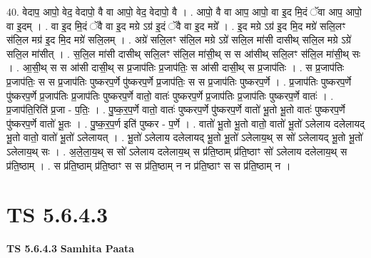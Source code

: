 \documentclass[17pt]{extarticle}
\begin{document}
40. वेदाप॒ आपो॒ वेद॒ वेदापो॒ वै वा आपो॒ वेद॒ वेदापो॒ वै । . आपो॒ वै वा आप॒ आपो॒ वा इ॒द मि॒दं ॅवा आप॒ आपो॒ वा इ॒दम् । . वा इ॒द मि॒दं ॅवै वा इ॒द मग्रे ऽग्र॑ इ॒दं ॅवै वा इ॒द मग्रे᳚ । . इ॒द मग्रे ऽग्र॑ इ॒द मि॒द मग्रे॑ सलि॒लꣳ स॑लि॒ल मग्र॑ इ॒द मि॒द मग्रे॑ सलि॒लम् । . अग्रे॑ सलि॒लꣳ स॑लि॒ल मग्रे ऽग्रे॑ सलि॒ल मा॑सी दासीथ् सलि॒ल मग्रे ऽग्रे॑ सलि॒ल मा॑सीत् । . स॒लि॒ल मा॑सी दासीथ् सलि॒लꣳ स॑लि॒ल मा॑सी॒थ् स स आ॑सीथ् सलि॒लꣳ स॑लि॒ल मा॑सी॒थ् सः । . आ॒सी॒थ् स स आ॑सी दासी॒थ् स प्र॒जाप॑तिः प्र॒जाप॑तिः॒ स आ॑सी दासी॒थ् स प्र॒जाप॑तिः । . स प्र॒जाप॑तिः प्र॒जाप॑तिः॒ स स प्र॒जाप॑तिः पुष्करप॒र्णे पु॑ष्करप॒र्णे प्र॒जाप॑तिः॒ स स प्र॒जाप॑तिः पुष्करप॒र्णे । . प्र॒जाप॑तिः पुष्करप॒र्णे पु॑ष्करप॒र्णे प्र॒जाप॑तिः प्र॒जाप॑तिः पुष्करप॒र्णे वातो॒ वातः॑ पुष्करप॒र्णे प्र॒जाप॑तिः प्र॒जाप॑तिः पुष्करप॒र्णे वातः॑ । . प्र॒जाप॑ति॒रिति॑ प्र॒जा - प॒तिः॒ । . पु॒ष्क॒र॒प॒र्णे वातो॒ वातः॑ पुष्करप॒र्णे पु॑ष्करप॒र्णे वातो॑ भू॒तो भू॒तो वातः॑ पुष्करप॒र्णे पु॑ष्करप॒र्णे वातो॑ भू॒तः । . पु॒ष्क॒र॒प॒र्ण इति॑ पुष्कर - प॒र्णे । . वातो॑ भू॒तो भू॒तो वातो॒ वातो॑ भू॒तो॑ ऽलेलाय दलेलायद् भू॒तो वातो॒ वातो॑ भू॒तो॑ ऽलेलायत् । . भू॒तो॑ ऽलेलाय दलेलायद् भू॒तो भू॒तो॑ ऽलेलाय॒थ् स सो॑ ऽलेलायद् भू॒तो भू॒तो॑ ऽलेलाय॒थ् सः । . अ॒ले॒ला॒य॒थ् स सो॑ ऽलेलाय दलेलाय॒थ् स प्र॑ति॒ष्ठाम् प्र॑ति॒ष्ठाꣳ सो॑ ऽलेलाय दलेलाय॒थ् स प्र॑ति॒ष्ठाम् । . स प्र॑ति॒ष्ठाम् प्र॑ति॒ष्ठाꣳ स स प्र॑ति॒ष्ठाम् न न प्र॑ति॒ष्ठाꣳ स स प्र॑ति॒ष्ठाम् न । \newline
\pagebreak
{}

\section{ TS 5.6.4.3 }

\textbf{TS 5.6.4.3 } \newline
\textbf{Samhita Paata} \newline
\end{document}
